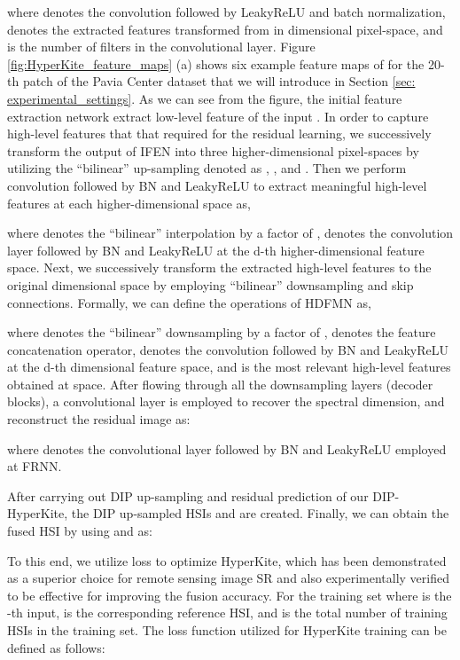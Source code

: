 \documentclass[journal]{IEEEtran}
\begin{document}
    where  denotes the  convolution followed by LeakyReLU and batch normalization,  denotes the extracted features transformed from  in  dimensional pixel-space, and  is the number of filters in the convolutional layer. Figure \ref{fig:HyperKite_feature_maps} (a) shows six example feature maps of  for the 20-th patch of the Pavia Center dataset that we will introduce in Section \ref{sec: experimental_settings}. As we can see from the figure, the initial feature extraction network  extract low-level feature of the input . In order to capture high-level features that that required for the residual learning, we successively transform the output of IFEN into three higher-dimensional pixel-spaces by utilizing the ``bilinear'' up-sampling denoted as , , and . Then we perform  convolution followed by BN and LeakyReLU to extract meaningful high-level features at each higher-dimensional space as, 
    
    where  denotes the ``bilinear'' interpolation by a factor of ,  denotes the  convolution layer followed by BN and LeakyReLU at the d-th higher-dimensional feature space. Next, we successively transform the extracted high-level features to the original dimensional space  by employing ``bilinear'' downsampling and skip connections. Formally, we can define the operations of HDFMN as,
    
    where  denotes the ``bilinear'' downsampling by a factor of ,  denotes the feature concatenation operator,  denotes the  convolution followed by BN and LeakyReLU at the d-th dimensional feature space, and  is the most relevant high-level features obtained at  space. After flowing through all the downsampling layers (decoder blocks), a  convolutional layer is employed to recover the spectral dimension, and reconstruct the residual image  as:
    
    where   denotes the  convolutional layer followed by BN and LeakyReLU employed at FRNN. 
    
    \par After carrying out DIP up-sampling and residual prediction of our DIP-HyperKite, the DIP up-sampled HSIs  and  are created. Finally, we can obtain the fused HSI  by using   and  as:
    
    
    \par To this end, we utilize  loss to optimize HyperKite, which has been demonstrated as a superior choice for remote sensing image SR \cite{Hyper-PNN, hyperspectral_pan_review} and also experimentally verified to be effective for improving the fusion accuracy. For the training set   where  is the -th input,  is the corresponding reference HSI, and  is the total number of training HSIs in the training set. The  loss function utilized for HyperKite training can be defined as follows:
    
\end{document}
